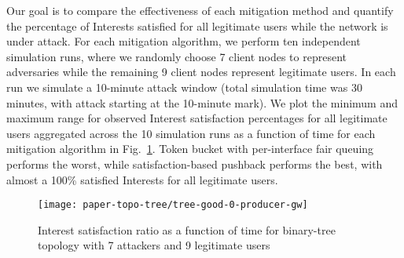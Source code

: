 
Our goal is to compare the effectiveness of each mitigation method and quantify the percentage of Interests satisfied for all legitimate users while the network is under attack. For each mitigation algorithm, we perform ten independent simulation runs, where we randomly choose 7 client nodes to represent adversaries while the remaining 9 client nodes represent legitimate users. In each run we simulate a 10-minute attack window (total simulation time was 30 minutes, with attack starting at the 10-minute mark). We plot the minimum and maximum range for observed Interest satisfaction percentages for all legitimate users aggregated across the 10 simulation runs as a function of time for each mitigation algorithm in Fig.~\ref{fig:small-scale attack progress}. Token bucket with per-interface fair queuing performs the worst, while satisfaction-based pushback performs the best, with almost a 100\%  satisfied Interests for all legitimate users.


\begin{figure}[]
  \centering
  \hspace{-0.8cm}\texttt{[image: paper-topo-tree/tree-good-0-producer-gw]}
  \vspace{-.3cm}
  \caption{Interest satisfaction ratio as a function of time for binary-tree topology with 7 attackers and 9 legitimate users}
  \label{fig:small-scale attack progress}
  \vspace{-.4cm}
\end{figure}



